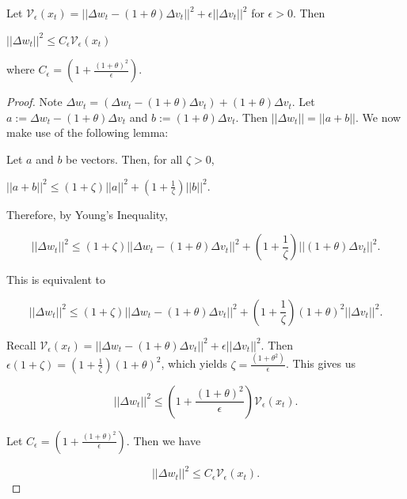 \documentclass[twoside,11pt]{article}
\begin{document}
\begin{theorem}
Let $\mathcal{V}_{\epsilon}(x_t) = ||\Delta w_t - (1+\theta)\Delta v_t||^2 + \epsilon||\Delta v_t||^2$ for $\epsilon > 0$. Then

\begin{center}
$||\Delta w_t||^2 \leq C_{\epsilon}\mathcal{V}_{\epsilon}(x_t)$
\end{center}

\noindent
where $C_{\epsilon} = (1 + \frac{(1+\theta)^2}{\epsilon})$.
\end{theorem}

\begin{proof}
Note $\Delta w_t = (\Delta w_t - (1+\theta)\Delta v_t)+(1+\theta)\Delta v_t$. Let $a:= \Delta w_t - (1+\theta)\Delta v_t$ and $b := (1+\theta)\Delta v_t$. Then $||\Delta w_t|| = ||a+b||$. We now make use of the following lemma:

\begin{lemma}
Let $a$ and $b$ be vectors. Then, for all $\zeta > 0$,

\begin{center}
$||a+b||^2 \leq (1+\zeta)||a||^2 + (1 + \frac{1}{\zeta})||b||^2$.
\end{center}
\end{lemma}

\noindent
Therefore, by Young's Inequality,

\begin{equation}
||\Delta w_t||^2 \leq (1+\zeta)||\Delta w_t - (1+\theta)\Delta v_t||^2 + (1+\frac{1}{\zeta})||(1+\theta)\Delta v_t||^2.    
\end{equation}

\noindent
This is equivalent to

\begin{equation}
||\Delta w_t||^2 \leq (1+\zeta)||\Delta w_t - (1+\theta)\Delta v_t||^2 + (1+\frac{1}{\zeta})(1+\theta)^2||\Delta v_t||^2.   
\end{equation}

\noindent
Recall $\mathcal{V}_{\epsilon}(x_t) = ||\Delta w_t - (1+\theta)\Delta v_t||^2 + \epsilon||\Delta v_t||^2$. Then $\epsilon(1+\zeta) = (1+\frac{1}{\zeta})(1+\theta)^2$, which yields $\zeta = \frac{(1+\theta^2)}{\epsilon}$. This gives us

\begin{equation}
||\Delta w_t||^2 \leq (1 + \frac{(1+\theta)^2}{\epsilon})\mathcal{V}_{\epsilon}(x_t).
\end{equation}

\noindent
Let $C_{\epsilon} = (1 + \frac{(1+\theta)^2}{\epsilon})$. Then we have

\begin{equation}
||\Delta w_t||^2 \leq C_{\epsilon}\mathcal{V}_{\epsilon}(x_t).
\end{equation}
\end{proof}
\end{document}
